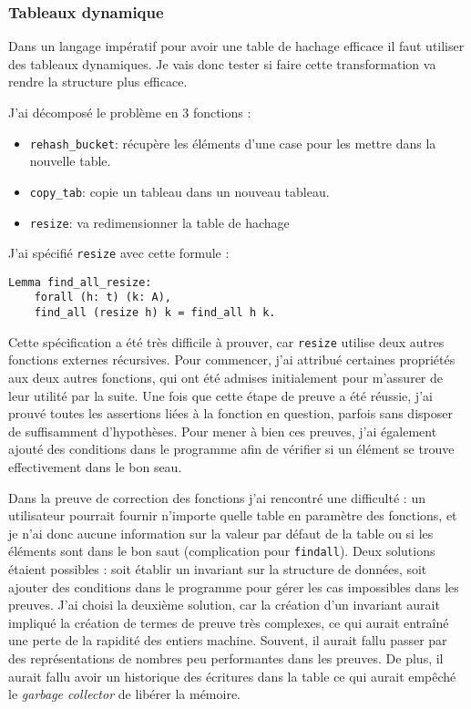 \documentclass{article}
\begin{document}
  \subsubsection{Tableaux dynamique}


  Dans un langage impératif pour avoir une table de hachage efficace il faut
utiliser des tableaux dynamiques. Je vais donc tester si faire cette
transformation va rendre la structure plus efficace.

J'ai décomposé le problème en 3 fonctions :

\begin{itemize}
  \item \texttt{rehash\_bucket}: récupère les éléments d'une case pour les mettre
    dans la nouvelle table.
  \item \texttt{copy\_tab}: copie un tableau dans un nouveau tableau.
  \item \texttt{resize}: va redimensionner la table de hachage
\end{itemize}

J'ai spécifié \texttt{resize} avec cette formule :

\begin{lstlisting}[language=Coq]
  Lemma find_all_resize:
    forall (h: t) (k: A),
    find_all (resize h) k = find_all h k.
\end{lstlisting}

  Cette spécification a été très difficile à prouver, car \texttt{resize}
utilise deux autres fonctions externes récursives. Pour
commencer, j'ai attribué certaines propriétés aux deux autres
fonctions, qui ont été admises initialement pour m'assurer de leur utilité
par la suite. Une fois que cette étape de preuve a été réussie, j'ai
prouvé toutes les assertions liées à la fonction en question, parfois sans
disposer de suffisamment d'hypothèses. Pour mener à bien ces preuves, j'ai
également ajouté des conditions dans le programme afin de vérifier
si un élément se trouve effectivement dans le bon seau.

  Dans la preuve de correction des fonctions j'ai rencontré une
difficulté : un utilisateur pourrait fournir n'importe quelle table en paramètre
des fonctions, et je n'ai donc aucune information sur la valeur par défaut de
la table ou si les éléments sont dans le bon saut (complication pour
\texttt{findall}). Deux solutions étaient possibles : soit établir un invariant
sur la structure de données, soit ajouter des conditions dans le programme pour
gérer les cas impossibles dans les preuves. J'ai choisi la deuxième solution,
car la création d'un invariant aurait impliqué la création de termes de preuve
très complexes, ce qui aurait entraîné une perte de la rapidité des entiers
machine. Souvent, il aurait fallu passer par des représentations de nombres peu
performantes dans les preuves. De plus, il aurait fallu avoir un
historique des écritures dans la table ce qui aurait empêché le \textit{garbage
collector} de libérer la mémoire.
\end{document}
